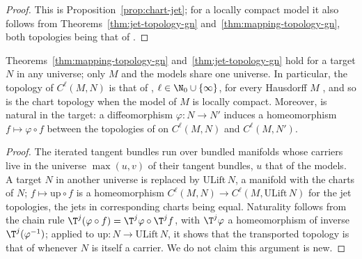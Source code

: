 \begin{proof}
  \leanok
  This is Proposition~\ref{prop:chart-jet}; for a locally compact model it also follows from
  Theorems~\ref{thm:jet-topology-gn} and~\ref{thm:mapping-topology-gn}, both topologies being that
  of \cite[Def.~4.1.2]{GN26}.
\end{proof}

\begin{theorem}
  \label{thm:mapping-topology-ulift}
  \leanok
  Theorems~\ref{thm:mapping-topology-gn} and~\ref{thm:jet-topology-gn} hold for a target $N$ in
  any universe; only $M$ and the models share one universe. In particular, the topology of
  $C^\ell(M, N)$ is that of \cite[Def.~4.1.2]{GN26}, $\ell \in \N_0 \cup \{\infty\}$, for every
  Hausdorff $M$ \cite[Thm.~4.2.2(b)]{GN26}, and so is the chart topology when the model of $M$ is
  locally compact. Moreover, \cite[Def.~4.1.2]{GN26} is natural in the target: a diffeomorphism
  $\varphi \colon N \to N'$ induces a homeomorphism $f \mapsto \varphi \circ f$ between the
  topologies of \cite[Def.~4.1.2]{GN26} on $C^\ell(M, N)$ and $C^\ell(M, N')$.
\end{theorem}

\begin{proof}
  \leanok
  The iterated tangent bundles run over bundled manifolds whose carriers live in the universe
  $\max(u, v)$ of their tangent bundles, $u$ that of the models. A target $N$ in another universe
  is replaced by $\mathrm{ULift}\, N$, a manifold with the charts of $N$; $f \mapsto
  \mathrm{up} \circ f$ is a homeomorphism $C^\ell(M, N) \to C^\ell(M, \mathrm{ULift}\, N)$ for the
  jet topologies, the jets in corresponding charts being equal. Naturality follows from the chain
  rule $\T^j(\varphi \circ f) = \T^j\varphi \circ \T^j f$, with $\T^j\varphi$ a homeomorphism of
  inverse $\T^j(\varphi^{-1})$; applied to $\mathrm{up} \colon N \to \mathrm{ULift}\, N$, it shows
  that the transported topology is that of \cite[Def.~4.1.2]{GN26} whenever $N$ is itself a
  carrier. We do not claim this argument is new.
\end{proof}
